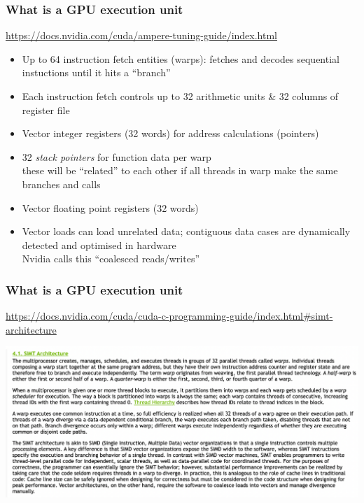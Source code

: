 \documentclass[pdf,ps,8pt]{beamer}
\newcommand{\link}[1]{\href{#1}{ {\color{blue} #1} }}
\begin{document}
\begin{frame}[fragile]\small\frametitle{ What is a GPU execution unit}

\link{https://docs.nvidia.com/cuda/ampere-tuning-guide/index.html}
  
  \begin{itemize}
  \item Up to 64 instruction fetch entities (warps): fetches and decodes sequential instuctions until it hits a ``branch''
  \item Each instruction fetch controls up to 32 arithmetic units \& 32 columns of register file
  \item Vector integer registers (32 words) for address calculations (pointers)
  \item 32 \emph{stack pointers} for function data per warp\\
        these will be ``related'' to each other if all threads in warp make the same branches and calls
  \item Vector floating point registers (32 words)
  \item Vector loads can load unrelated data; contiguous data cases are dynamically detected and optimised in hardware\\
         Nvidia calls this ``coalesced  reads/writes''
    
    \end{itemize}

\end{frame}

\begin{frame}[fragile]\small\frametitle{ What is a GPU execution unit}

  \href{https://docs.nvidia.com/cuda/cuda-c-programming-guide/index.html#simt-architecture}
        {\color{blue}https://docs.nvidia.com/cuda/cuda-c-programming-guide/index.html\#simt-architecture}

  \includegraphics[width=\textwidth]{NvidiasWords.pdf}
  
\end{frame}
\end{document}
